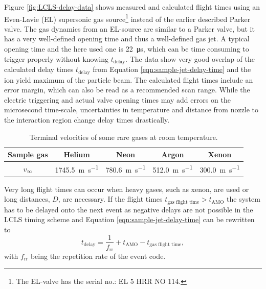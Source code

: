Figure \ref{fig:LCLS-delay-data} shows measured and calculated flight times using an Even-Lavie (EL) supersonic gas source\footnote{The EL-valve has the serial no.: EL 5 HRR NO 114.} instead of the earlier described Parker valve. The gas dynamics from an EL-source are similar to a Parker valve, but it has a very well-defined opening time and thus a well-defined gas jet. A typical opening time and the here used one is \SI{22}{\micro\second}, which can be time consuming to trigger properly without knowing $t_{\text{delay}}$. The data show very good overlap of the calculated delay times $t_{\text{delay}}$ from Equation \ref{eqn:sample-jet-delay-time} and the ion yield maximum of the particle beam. The calculated flight times include an error margin, which can also be read as a recommended scan range. While the electric triggering and actual valve opening times may add errors on the microsecond time-scale, uncertainties in temperature and distance from nozzle to the interaction region change delay times drastically.\\[1\baselineskip]
%
\begin{table}
\centering
\begin{tabular}{ | c | c | c | c | c | }
\hline
	\textbf{Sample gas} & \textbf{Helium} & \textbf{Neon} & \textbf{Argon} & \textbf{Xenon} \\ \hline
	$v_{\infty}$ & \SI{1745.5}{\meter\per\second} & \SI{780.6}{\meter\per\second} & \SI{512.0}{\meter\per\second} & \SI{300.0}{\meter\per\second} \\ \hline
\end{tabular}
\caption{Terminal velocities of some rare gases at room temperature.}
\label{tab:terminal-velocities}
\end{table}
%
Very long flight times can occur when heavy gases, such as xenon, are used or long distances, $D$, are necessary. If the flight times $t_{\text{gas flight time}} > t_{\text{AMO}}$ the system has to be delayed onto the next event as negative delays are not possible in the LCLS timing scheme and Equation \eqref{eqn:sample-jet-delay-time} can be rewritten to
\begin{equation}
t_{\text{delay}} = \frac{1}{f_{\text{rr}}} + t_{\text{AMO}} - t_{\text{gas flight time}},
\label{eqn:sample-jet-delay-time-next}
\end{equation}
with $f_{\text{rr}}$ being the repetition rate of the event code.
%
%
%
